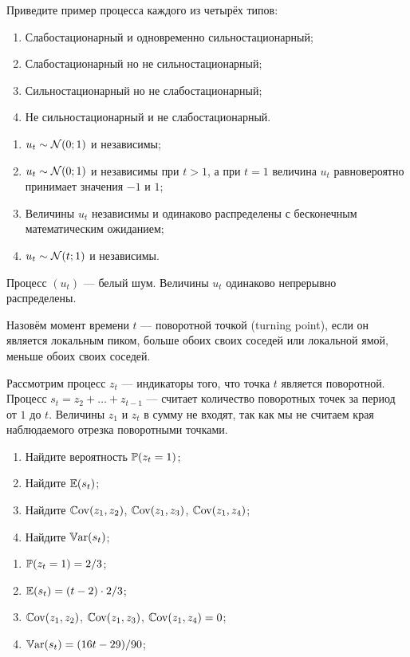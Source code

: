 \begin{problem}
Приведите пример процесса каждого из четырёх типов:
\begin{enumerate}
  \item Слабостационарный и одновременно сильностационарный;
  \item Слабостационарный но не сильностационарный;
  \item Сильностационарный но не слабостационарный;
  \item Не сильностационарный и не слабостационарный.
\end{enumerate}
\begin{sol}
\begin{enumerate}
  \item $u_t \sim \cN(0;1)$ и независимы;
  \item $u_t \sim \cN(0;1)$ и независимы при $t>1$, а при $t=1$ величина $u_t$ равновероятно
  принимает значения $-1$ и $1$;
  \item Величины $u_t$ независимы и одинаково распределены с бесконечным математическим ожиданием;
  \item $u_t \sim \cN(t;1)$ и независимы.
\end{enumerate}
\end{sol}
\end{problem}



\begin{problem}
Процесс $(u_t)$ — белый шум. Величины $u_t$ одинаково непрерывно распределены.

Назовём момент времени $t$ — поворотной точкой (turning point), если он является локальным пиком, больше обоих своих соседей 
или локальной ямой, меньше обоих своих соседей.

Рассмотрим процесс $z_t$ — индикаторы того, что точка $t$ является поворотной. 
Процесс $s_t = z_2 + \ldots + z_{t-1}$ — считает количество поворотных точек за период от $1$ до $t$.
Величины $z_1$ и $z_t$ в сумму не входят, так как мы не считаем края наблюдаемого отрезка поворотными точками. 


\begin{enumerate}
  \item Найдите вероятность $\P(z_t = 1)$;
  \item Найдите $\E(s_t)$;
  \item Найдите $\Cov(z_1, z_2)$, $\Cov(z_1, z_3)$, $\Cov(z_1, z_4)$;
  \item Найдите $\Var(s_t)$;
\end{enumerate}
\begin{sol}
  \begin{enumerate}
  \item $\P(z_t = 1) = 2/3$;
  \item $\E(s_t) = (t-2) \cdot 2/3$;
  \item $\Cov(z_1, z_2)$, $\Cov(z_1, z_3)$, $\Cov(z_1, z_4) = 0$;
  \item $\Var(s_t) = (16t - 29)/90$;
  \end{enumerate}

\end{sol}
\end{problem}
  


